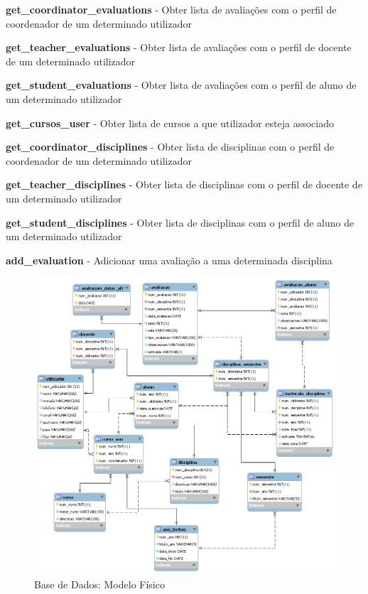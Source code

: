 \begin{list}{\textbf{-}}{\textbf{STORED PROCEDURES}}
\item \textbf{get_coordinator_evaluations} - Obter lista de avaliações com o perfil de coordenador de um determinado utilizador
\item \textbf{get_teacher_evaluations} - Obter lista de avaliações com o perfil de docente de um determinado utilizador
\item \textbf{get_student_evaluations} - Obter lista de avaliações com o perfil de aluno de um determinado utilizador
\item \textbf{get_cursos_user} - Obter lista de cursos a que utilizador esteja associado
\item \textbf{get_coordinator_disciplines} - Obter lista de disciplinas com o perfil de coordenador de um determinado utilizador
\item \textbf{get_teacher_disciplines} - Obter lista de disciplinas com o perfil de docente de um determinado utilizador
\item \textbf{get_student_disciplines} - Obter lista de disciplinas com o perfil de aluno de um determinado utilizador
\item \textbf{add_evaluation} - Adicionar uma avaliação a uma determinada disciplina
\end{list}

\begin{figure}[!htbp]
\centering
\includegraphics{imagens/base_de_dados.png}
\caption{Base de Dados: Modelo Físico}
\label{fig:modelo_fisico}
\end{figure}

